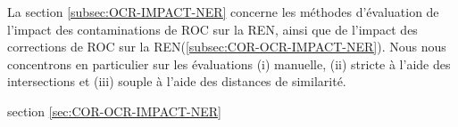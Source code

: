 La section \ref{subsec:OCR-IMPACT-NER} concerne les méthodes d'évaluation de l'impact des contaminations de ROC sur la REN, ainsi que de l'impact des corrections de ROC sur la REN(\ref{subsec:COR-OCR-IMPACT-NER}). Nous nous concentrons en particulier sur les évaluations (i) manuelle, (ii) \og{}stricte\fg{} à l'aide des intersections et (iii) \og{}souple\fg{} à l'aide des distances de similarité.


section \ref{sec:COR-OCR-IMPACT-NER}
